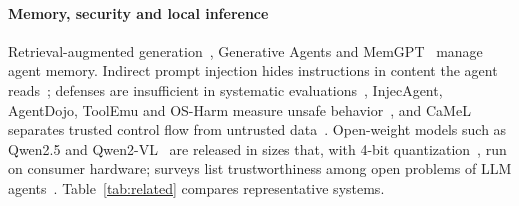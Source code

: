 \paragraph{Memory, security and local inference} Retrieval-augmented generation~\cite{lewis2020rag,reimers2019sbert}, Generative Agents and MemGPT~\cite{park2023generative,packer2023memgpt} manage agent memory. Indirect prompt injection hides instructions in content the agent reads~\cite{greshake2023indirect}; defenses are insufficient in systematic evaluations~\cite{liu2024formalizing}, InjecAgent, AgentDojo, ToolEmu and OS-Harm measure unsafe behavior~\cite{zhan2024injecagent,debenedetti2024agentdojo,ruan2024toolemu,kuntz2025osharm}, and CaMeL separates trusted control flow from untrusted data~\cite{debenedetti2025camel}. Open-weight models such as Qwen2.5 and Qwen2-VL~\cite{yang2024qwen25,wang2024qwen2vl} are released in sizes that, with 4-bit quantization~\cite{lin2024awq}, run on consumer hardware; surveys list trustworthiness among open problems of LLM agents~\cite{wang2024survey,xi2025rise}. Table~\ref{tab:related} compares representative systems.


